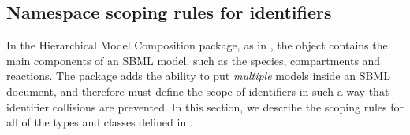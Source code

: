 \clearpage

\subsection{Namespace scoping rules for identifiers}
\label{namespaces}

In the Hierarchical Model Composition package, as in \sbmlthreecore, the \Model object contains the main components of an SBML model, such as the species, compartments and reactions.  The package adds the ability to put \emph{multiple} models inside an SBML document, and therefore must define the scope of identifiers in such a way that identifier collisions are prevented.  In this section, we describe the scoping rules for all of the types and classes defined in .

